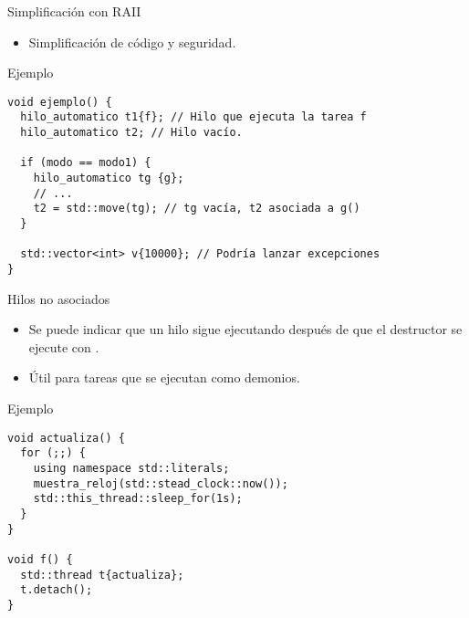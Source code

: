 \begin{frame}[fragile]{Simplificación con RAII}
\begin{itemize}
  \item Simplificación de código y seguridad.
\end{itemize}
\begin{block}{Ejemplo}
\begin{lstlisting}
void ejemplo() {
  hilo_automatico t1{f}; // Hilo que ejecuta la tarea f
  hilo_automatico t2; // Hilo vacío.

  if (modo == modo1) {
    hilo_automatico tg {g}; 
    // ...
    t2 = std::move(tg); // tg vacía, t2 asociada a g()
  }

  std::vector<int> v{10000}; // Podría lanzar excepciones
}
\end{lstlisting}
\end{block}
\end{frame}

\begin{frame}[fragile]{Hilos no asociados}
\begin{itemize}
  \item Se puede indicar que un hilo sigue ejecutando después de que el destructor se ejecute con .
  \item Útil para tareas que se ejecutan como demonios.
\end{itemize}
\begin{block}{Ejemplo}
\begin{lstlisting}[basicstyle=\tiny]
void actualiza() {
  for (;;) {
    using namespace std::literals;
    muestra_reloj(std::stead_clock::now());
    std::this_thread::sleep_for(1s);
  }
}

void f() {
  std::thread t{actualiza};
  t.detach();
}
\end{lstlisting}
\end{block}
\end{frame}

